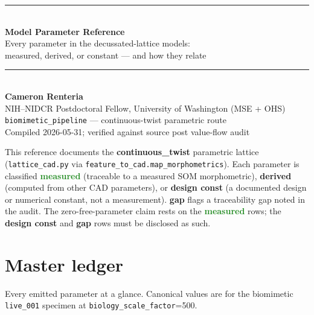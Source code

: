 \documentclass[11pt]{article}
\newcommand{\param}[1]{\texttt{#1}}
\newcommand{\sMeas}{\textcolor{ForestGreen}{\textbf{measured}}}
\newcommand{\sDeriv}{\textcolor{NavyBlue}{\textbf{derived}}}
\newcommand{\sConst}{\textcolor{RawSienna}{\textbf{design const}}}
\newcommand{\sGap}{\textcolor{BrickRed}{\textbf{gap}}}
\begin{document}
\begin{titlepage}
\centering
\vspace*{2.5cm}
{\color{HeadBlue}\rule{\textwidth}{2pt}}\\[0.6cm]
{\Huge\bfseries\color{HeadBlue} Model Parameter Reference}\\[0.35cm]
{\Large Every parameter in the decussated-lattice models:}\\[0.15cm]
{\Large measured, derived, or constant --- and how they relate}\\[0.5cm]
{\color{HeadBlue}\rule{\textwidth}{2pt}}\\[1.2cm]
{\large\textbf{Cameron Renteria}}\\[0.2cm]
{\normalsize NIH--NIDCR Postdoctoral Fellow, University of Washington (MSE + OHS)}\\[1.0cm]
{\normalsize \texttt{biomimetic\_pipeline} --- continuous-twist parametric route}\\[0.3cm]
{\normalsize Compiled 2026-05-31; verified against source post value-flow audit}\\
\vfill
\begin{notebox}[Scope]
\small This reference documents the \textbf{continuous\_twist} parametric lattice
(\param{lattice\_cad.py} via \param{feature\_to\_cad.map\_morphometrics}). Each
parameter is classified \sMeas{} (traceable to a measured SOM morphometric),
\sDeriv{} (computed from other CAD parameters), or \sConst{} (a documented design
or numerical constant, not a measurement). \sGap{} flags a traceability gap noted
in the audit. The zero-free-parameter claim rests on the \sMeas{} rows; the
\sConst{} and \sGap{} rows must be disclosed as such.
\end{notebox}
\end{titlepage}

\section{Master ledger}
Every emitted parameter at a glance. Canonical values are for the biomimetic
\param{live\_001} specimen at \param{biology\_scale\_factor}=500.
\end{document}
